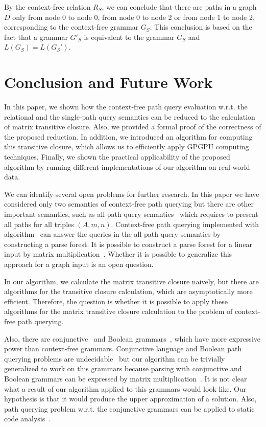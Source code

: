 \documentclass[runningheads,a4paper]{llncs}
\begin{document}
By the context-free relation $R_S$, we can conclude that there are paths in a graph $D$ only from node 0 to node 0, from node 0 to node 2 or from node 1 to node 2, corresponding to the context-free grammar $G_S$. This conclusion is based on the fact that a grammar $G'_S$ is equivalent to the grammar $G_S$ and $L(G_S) = L(G_S')$.


\section{Conclusion and Future Work}%
In this paper, we shown how the context-free path query evaluation w.r.t. the relational and the single-path query semantics can be reduced to the calculation of matrix transitive closure. Also, we provided a formal proof of the correctness of the proposed reduction. In addition, we introduced an algorithm for computing this transitive closure, which allows us to efficiently apply GPGPU computing techniques. Finally, we shown the practical applicability of the proposed algorithm by running different implementations of our algorithm on real-world data.

We can identify several open problems for further research. In this paper we have considered only two semantics of context-free path querying but there are other important semantics, such as all-path query semantics~\cite{hellingsPathQuerying} which requires to present all paths for all triples $(A,m,n)$. Context-free path querying implemented with algorithm~\cite{GLL} can answer the queries in the all-path query semantics by constructing a parse forest. It is possible to construct a parse forest for a linear input by matrix multiplication~\cite{okhotin_cyk}. Whether it is possible to generalize this approach for a graph input is an open question.

In our algorithm, we calculate the matrix transitive closure naively, but there are algorithms for the transitive closure calculation, which are asymptotically more efficient. Therefore, the question is whether it is possible to apply these algorithms for the matrix transitive closure calculation to the problem of context-free path querying.

Also, there are conjunctive~\cite{okhotinConjAndBool} and Boolean grammars~\cite{okhotinBoolean}, which have more expressive power than context-free grammars. Conjunctive language and Boolean path querying problems are undecidable~\cite{hellingsRelational} but our algorithm can be trivially generalized to work on this grammars because parsing with conjunctive and Boolean grammars can be expressed by matrix multiplication~\cite{okhotin_cyk}. It is not clear what a result of our algorithm applied to this grammars would look like. Our hypothesis is that it would produce the upper approximation of a solution. Also, path querying problem w.r.t. the conjunctive grammars can be applied to static code analysis~\cite{zhang2017context}.
\end{document}
